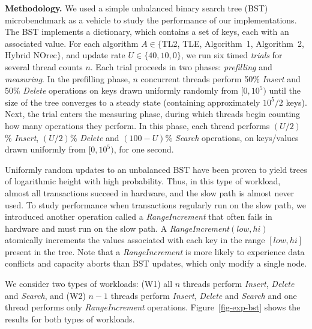 \vspace{1mm}\noindent\textbf{Methodology.}
We used a simple unbalanced binary search tree (BST) microbenchmark as a vehicle to study the performance of our implementations.
The BST implements a dictionary, which contains a set of keys, each with an associated value.
For each algorithm $A \in \{$TL2, TLE, Algorithm~1, Algorithm~2, Hybrid NOrec$\}$, and update rate $U \in \{40, 10, 0\}$, we run six timed \textit{trials} for several thread counts $n$.
Each trial proceeds in two phases: \textit{prefilling} and \textit{measuring}.
In the prefilling phase, $n$ concurrent threads perform 50\% \textit{Insert} and 50\% \textit{Delete} operations on keys drawn uniformly randomly from $[0, 10^5)$ until the size of the tree converges to a steady state (containing approximately $10^5/2$ keys).
Next, the trial enters the measuring phase, during which threads begin counting how many operations they perform.
In this phase, each thread performs $(U/2)$\% \textit{Insert}, $(U/2)$\% \textit{Delete} and $(100-U)$\% \textit{Search} operations, on keys/values drawn uniformly from $[0,10^5)$, for one second.

Uniformly random updates to an unbalanced BST have been proven to yield trees of logarithmic height with high probability.
Thus, in this type of workload, almost all transactions succeed in hardware, and the slow path is almost never used.
To study performance when transactions regularly run on the slow path, we introduced another operation called a \textit{RangeIncrement} that often fails in hardware and must run on the slow path.
A \textit{RangeIncrement}$(low, hi)$ atomically increments the values 
associated with each key in the range $[low, hi]$ present in the tree.
Note that a \textit{RangeIncrement} is more likely to experience data 
conflicts and capacity aborts than BST updates, which only modify a single node.

We consider two types of workloads: (W1) all $n$ threads perform \textit{Insert}, \textit{Delete} and \textit{Search}, and (W2) $n-1$ threads perform \textit{Insert}, \textit{Delete} and \textit{Search} and one thread performs only \textit{RangeIncrement} operations.
Figure~\ref{fig-exp-bst} shows the results for both types of workloads.

